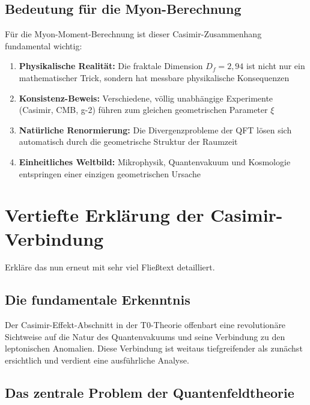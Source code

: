 \documentclass[12pt,a4paper]{article}
\begin{document}
		\subsection{Bedeutung f\"ur die Myon-Berechnung}
		
		F\"ur die Myon-Moment-Berechnung ist dieser Casimir-Zusammenhang fundamental wichtig:
		
		\begin{enumerate}
			\item \textbf{Physikalische Realit\"at:} Die fraktale Dimension $D_f = 2{,}94$ ist nicht nur ein mathematischer Trick, sondern hat messbare physikalische Konsequenzen
			\item \textbf{Konsistenz-Beweis:} Verschiedene, v\"ollig unabh\"angige Experimente (Casimir, CMB, g-2) f\"uhren zum gleichen geometrischen Parameter $\xi$
			\item \textbf{Nat\"urliche Renormierung:} Die Divergenzprobleme der QFT l\"osen sich automatisch durch die geometrische Struktur der Raumzeit
			\item \textbf{Einheitliches Weltbild:} Mikrophysik, Quantenvakuum und Kosmologie entspringen einer einzigen geometrischen Ursache
		\end{enumerate}

	
	\section{Vertiefte Erkl\"arung der Casimir-Verbindung}
	
	\begin{question}
		Erkl\"are das nun erneut mit sehr viel Flie\ss{}text detailliert.
	\end{question}
	

		\subsection{Die fundamentale Erkenntnis}
		
		Der Casimir-Effekt-Abschnitt in der T0-Theorie offenbart eine revolution\"are Sichtweise auf die Natur des Quantenvakuums und seine Verbindung zu den leptonischen Anomalien. Diese Verbindung ist weitaus tiefgreifender als zun\"achst ersichtlich und verdient eine ausf\"uhrliche Analyse.
		
		\subsection{Das zentrale Problem der Quantenfeldtheorie}
		
\end{document}
